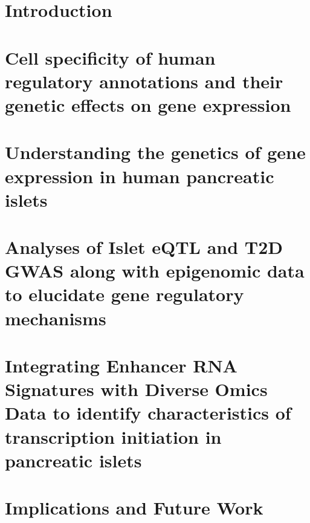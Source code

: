 \documentclass[reqno,12pt,oneside]{report} %
\theoremstyle{plain}
\theoremstyle{definition}
\theoremstyle{remark}
\numberwithin{theorem}{chapter}     %
\begin{document}
\chapter{Introduction}
\label{chap:intro}



\chapter{Cell specificity of human regulatory annotations and their genetic effects on gene expression}
\label{chap:2_regulatory_elements}



\chapter{Understanding the genetics of gene expression in human pancreatic islets}
\label{chap:3_islet_eqtl}



\chapter{Analyses of Islet eQTL and T2D GWAS along with epigenomic data to elucidate gene regulatory mechanisms}
\label{chap:4_inspire}



\chapter{Integrating Enhancer RNA Signatures with Diverse Omics Data to identify characteristics of transcription initiation in pancreatic islets}
\label{chap:cc}



\chapter{Implications and Future Work}
\label{chap:conclusion}

 

%
%
%
 
\startbibliography
 \begin{singlespace} %
% 

 
 \end{singlespace}

%
\end{document}
